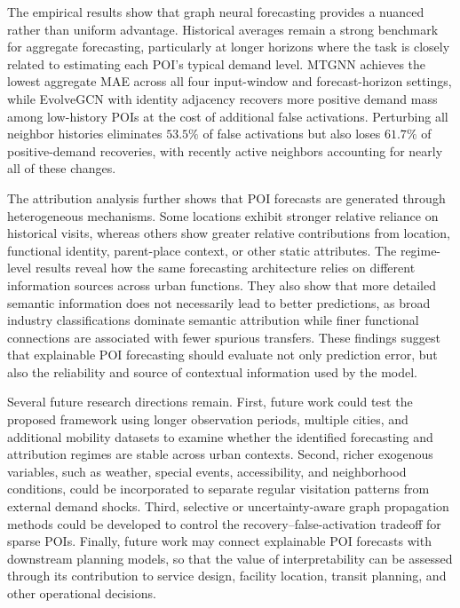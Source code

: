 \documentclass[preprint,authoryear,11pt]{elsarticle}
\theoremstyle{definition}
\begin{document}
The empirical results show that graph neural forecasting provides a nuanced rather than uniform advantage. Historical averages remain a strong benchmark for aggregate forecasting, particularly at longer horizons where the task is closely related to estimating each POI's typical demand level. 
MTGNN achieves the lowest aggregate MAE across all four input-window and forecast-horizon settings, while EvolveGCN with identity adjacency recovers more positive demand mass among low-history POIs at the cost of additional false activations.
Perturbing all neighbor histories eliminates \(53.5\%\) of false activations but also loses \(61.7\%\) of positive-demand recoveries, with recently active neighbors accounting for nearly all of these changes.


The attribution analysis further shows that POI forecasts are generated through heterogeneous mechanisms. 
Some locations exhibit stronger relative reliance on historical visits, whereas others show greater relative contributions from location, functional identity, parent-place context, or other static attributes.
The regime-level results reveal how the same forecasting architecture relies on different information sources across urban functions.
They also show that more detailed semantic information does not necessarily lead to better predictions, as broad industry classifications dominate semantic attribution while finer functional connections are associated with fewer spurious transfers.
These findings suggest that explainable POI forecasting should evaluate not only prediction error, but also the reliability and source of contextual information used by the model.

Several future research directions remain. First, future work could test the proposed framework using longer observation periods, multiple cities, and additional mobility datasets to examine whether the identified forecasting and attribution regimes are stable across urban contexts. Second, richer exogenous variables, such as weather, special events, accessibility, and neighborhood conditions, could be incorporated to separate regular visitation patterns from external demand shocks. Third, selective or uncertainty-aware graph propagation methods could be developed to control the recovery--false-activation tradeoff for sparse POIs. Finally, future work may connect explainable POI forecasts with downstream planning models, so that the value of interpretability can be assessed through its contribution to service design, facility location, transit planning, and other operational decisions.
\end{document}
